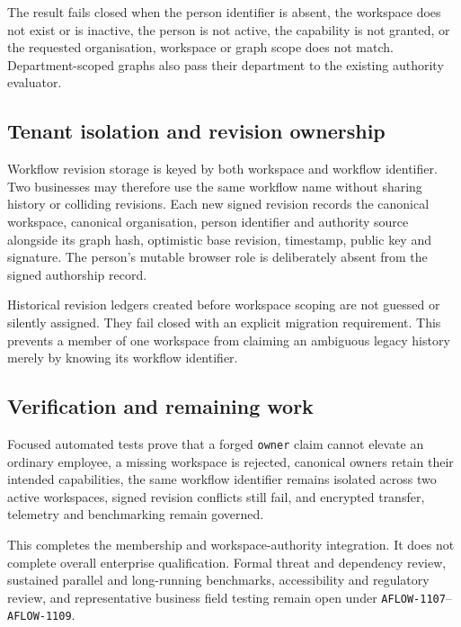 The result fails closed when the person identifier is absent, the workspace does not exist or is
inactive, the person is not active, the capability is not granted, or the requested organisation,
workspace or graph scope does not match. Department-scoped graphs also pass their department to the
existing authority evaluator.

\subsection{Tenant isolation and revision ownership}

Workflow revision storage is keyed by both workspace and workflow identifier. Two businesses may
therefore use the same workflow name without sharing history or colliding revisions. Each new signed
revision records the canonical workspace, canonical organisation, person identifier and authority
source alongside its graph hash, optimistic base revision, timestamp, public key and signature.
The person's mutable browser role is deliberately absent from the signed authorship record.

Historical revision ledgers created before workspace scoping are not guessed or silently assigned.
They fail closed with an explicit migration requirement. This prevents a member of one workspace
from claiming an ambiguous legacy history merely by knowing its workflow identifier.

\subsection{Verification and remaining work}

Focused automated tests prove that a forged \texttt{owner} claim cannot elevate an ordinary
employee, a missing workspace is rejected, canonical owners retain their intended capabilities,
the same workflow identifier remains isolated across two active workspaces, signed revision
conflicts still fail, and encrypted transfer, telemetry and benchmarking remain governed.

This completes the membership and workspace-authority integration. It does not complete overall
enterprise qualification. Formal threat and dependency review, sustained parallel and long-running
benchmarks, accessibility and regulatory review, and representative business field testing remain
open under \texttt{AFLOW-1107}--\texttt{AFLOW-1109}.
